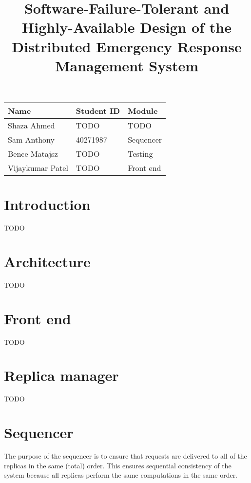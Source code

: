\documentclass{article}
\title{Software-Failure-Tolerant and Highly-Available Design of the Distributed Emergency Response Management System}
\author{}
\begin{document}
\maketitle

\begin{center}
\begin{tabular}{l l l}
	\textbf{Name} & \textbf{Student ID} & \textbf{Module} \\ \hline\hline
	Shaza Ahmed & TODO & TODO \\ \hline
	Sam Anthony & 40271987 & Sequencer \\ \hline
	Bence Matajsz & TODO & Testing \\ \hline
	Vijaykumar Patel & TODO & Front end \\ \hline
\end{tabular}
\end{center}


\section{Introduction}

TODO


\section{Architecture}

TODO

\section{Front end}

TODO


\section{Replica manager}

TODO


\section{Sequencer}

The purpose of the sequencer is to ensure that requests are delivered to all of the replicas in the same (total) order.
This ensures sequential consistency of the system because all replicas perform the same computations in the same order.

\paragraph{}
\end{document}

